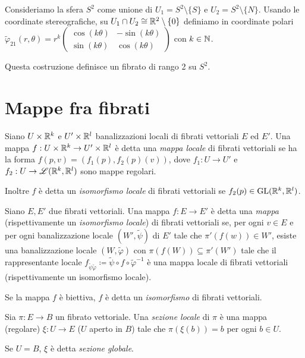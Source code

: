 \begin{example}
	Consideriamo la sfera $S^2$ come unione di $U_1 = S^2\setminus \{S\}$ e $U_2 = S^2\setminus \{N\}$. Usando le coordinate stereografiche, su $U_1\cap U_2\cong \mathbb R^2\setminus\{0\}$ definiamo in coordinate polari $\tilde\varphi_{21}(r,\theta) = r^k \left(\begin{matrix} \cos(k\theta)& -\sin(k\theta)\\ \sin(k\theta)& \cos(k\theta) \end{matrix}\right)$ con $k\in\mathbb N$.
	
	Questa costruzione definisce un fibrato di rango 2 su $S^2$.
\end{example}


\section{Mappe fra fibrati}

\begin{definition}  
	Siano $U\times\mathbb R^k$ e $U'\times\mathbb R^l$ banalizzazioni locali di fibrati vettoriali $E$ ed $E'$. Una mappa $f:U\times\mathbb R^k\to U'\times\mathbb R^l$ è detta una \emph{mappa locale} di fibrati vettoriali se ha la forma $f(p,v) = (f_1(p), f_2(p)(v) )$, dove $f_1:U\to U'$ e $f_2:U \to \mathscr L(\mathbb R^k,\mathbb R^l)$ sono mappe regolari.
	
	Inoltre $f$ è detta un \emph{isomorfismo locale} di fibrati vettoriali se $f_2(p)\in \mathrm{GL}(\mathbb R^k,\mathbb R^l)$.
\end{definition}


\begin{definition}  
	Siano $E,E'$ due fibrati vettoriali. Una mappa $f:E \to E'$ è detta una \emph{mappa} (rispettivamente un \emph{isomorfismo locale}) di fibrati vettoriali se, per ogni $v \in E$ e per ogni banalizzazione locale $(W',\tilde\psi)$ di $E'$ tale che $\pi'(f(w))\in W'$, esiste una banalizzazione locale $(W,\tilde\varphi)$ con $\pi(f(W))\subseteq \pi'(W')$ tale che il rappresentante locale $f_{\tilde\psi\tilde\varphi}\coloneqq \tilde\psi\circ f \circ \tilde\varphi^{-1}$ è una mappa locale di fibrati vettoriali (rispettivamente un isomorfismo locale).
	
	Se la mappa $f$ è biettiva, $f$ è detta un \emph{isomorfismo} di fibrati vettoriali.
\end{definition}


\begin{definition}  
	Sia $\pi:E\to B$ un fibrato vettoriale. Una \emph{sezione locale} di $\pi$ è una mappa (regolare) $\xi:U \to E$ ($U$ aperto in $B$) tale che $\pi(\xi(b)) = b$ per ogni $b\in U$.
	
	Se $U = B$, $\xi$ è detta \emph{sezione globale}.
\end{definition}

